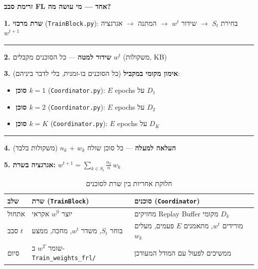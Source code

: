 \documentclass[11pt,a4paper]{article}
\newenvironment{infobox}[2][gray]{%
  \par\smallskip
  \begin{mdframed}[
    linecolor=#1!60!black,
    linewidth=0.7pt,
    backgroundcolor=#1!6,
    roundcorner=3pt,
    innertopmargin=7pt,
    innerbottommargin=7pt,
    innerleftmargin=8pt,
    innerrightmargin=8pt,
    skipabove=6pt,
    skipbelow=6pt
  ]%
  {\color{#1!70!black}\bfseries #2}\par\smallskip
}{%
  \end{mdframed}%
  \par\smallskip
}
\begin{document}
\begin{infobox}[blue]{זרימת סבב FL אחד --- מי עושה מה?}
\textbf{1. שרת מרכזי} (\texttt{TrainBlock.py}): בחירת $S_t$ $\to$ שידור $w^t$ $\to$ המתנה $\to$ אגרגציה $w^{t+1}$

\vspace{6pt}
\hrule
\vspace{6pt}

\textbf{2. שידור למטה} --- כל הסוכנים מקבלים $w^t$ (משקולות, KB)

\vspace{6pt}

\textbf{3. אימון מקומי במקביל} (כל הסוכנים בו-זמנית, בלי לדבר ביניהם):
\begin{itemize}[nosep,leftmargin=1.2cm]
  \item \textbf{סוכן $k{=}1$} (\texttt{Coordinator.py}): $E$ epochs על $D_1$
  \item \textbf{סוכן $k{=}2$} (\texttt{Coordinator.py}): $E$ epochs על $D_2$
  \item \textbf{סוכן $k{=}K$} (\texttt{Coordinator.py}): $E$ epochs על $D_K$
\end{itemize}

\vspace{6pt}
\hrule
\vspace{6pt}

\textbf{4. העלאה למעלה} --- כל סוכן שולח $w_k$ + $n_k$ (משקולות בלבד)

\vspace{6pt}

\textbf{5. אגרגציה בשרת:}
$w^{t+1} = \sum_{k \in S_t} \frac{n_k}{n}\, w_k$
\end{infobox}

\begin{table}[H]
  \centering
  \caption{חלוקת אחריות בין שרת לסוכנים}
  \label{tab:server-vs-clients}
  \begin{tabular}{@{}>{\raggedright\arraybackslash}p{2.4cm}>{\raggedright\arraybackslash}p{5.8cm}>{\raggedright\arraybackslash}p{5.8cm}@{}}
    \toprule
    \textbf{שלב} & \textbf{שרת (\texttt{TrainBlock})} & \textbf{סוכנים (\texttt{Coordinator})} \\
    \midrule
    אתחול &
    יוצר $w^0$ אקראי &
    מחזיקים Replay Buffer מקומי $D_k$ \\
    \addlinespace
    סבב $t$ &
    בוחר $S_t$, משדר $w^t$, מחכה, ממצע &
    מורידים $w^t$, מתאמנים $E$ פעמים, מעלים $w_k$ \\
    \addlinespace
    סיום &
    שומר $w^T$ ב-\texttt{Train\_weights\_frl/} &
    ממשיכים לפעול עם המודל המעודכן \\
    \bottomrule
  \end{tabular}
\end{table}
\end{document}
